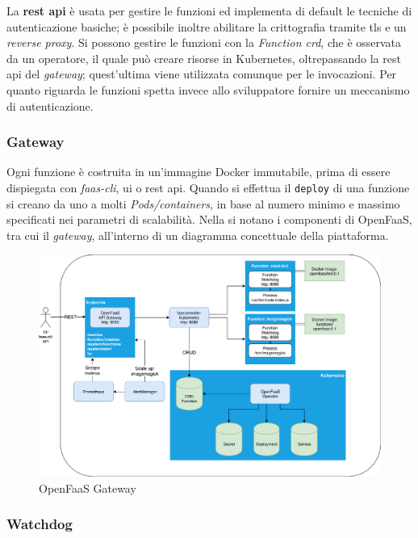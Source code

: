 \documentclass[12pt,a4paper,openany,twoside]{book}
\begin{document}
La \textbf{\ac{rest} \ac{api}} è usata per gestire le funzioni ed implementa di default le tecniche di autenticazione basiche; è possibile inoltre abilitare la crittografia tramite \ac{tls} e un \textit{reverse proxy}.
Si possono gestire le funzioni con la \textit{Function \ac{crd}}, che è osservata da un operatore, il quale può creare risorse in Kubernetes, oltrepassando la \ac{rest} \ac{api} del \textit{gateway}; quest'ultima viene utilizzata comunque per le invocazioni. Per quanto riguarda le funzioni spetta invece allo sviluppatore fornire un meccanismo di autenticazione.

\subsubsection{Gateway}

Ogni funzione è costruita in un'immagine Docker immutabile, prima di essere dispiegata con \textit{faas-cli}, \ac{ui} o \ac{rest} \ac{api}.
Quando si effettua il \texttt{deploy} di una funzione si creano da uno a molti \textit{Pods/containers}, in base al numero minimo e massimo specificati nei parametri di scalabilità.
Nella  si notano i componenti di OpenFaaS, tra cui il \textit{gateway}, all'interno di un diagramma concettuale della piattaforma.

\begin{figure}[ht]
    \centering
    \includegraphics[width=\linewidth]{figures/OpenFaaS_gateway.pdf}
    \caption{OpenFaaS Gateway}
    \label{fig:openfaas-gateway}
\end{figure}

\subsubsection{Watchdog}
\end{document}
